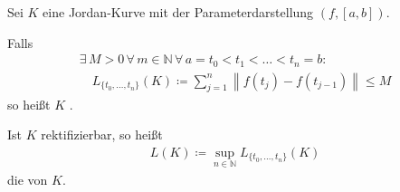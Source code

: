\documentclass[a4paper,10pt]{scrbook}
\begin{document}
\begin{theorem}[Definition]
  Sei $K$ eine Jordan-Kurve mit der Parameterdarstellung $(f,[a,b])$.
  \begin{enum-arab}
    \item Falls
    \begin{gather*}
      \exists \, M > 0 \, \forall \, m \in \mathbb{N} \, \forall \, a=t_0 < t_1 < \ldots < t_n=b : \\ \quad L_{\{t_0,\ldots,t_n\}}(K) \coloneq \sum\limits_{j=1}^{n} \left\| f(t_j) - f(t_{j-1}) \right\| \leq M
    \end{gather*}
    so heißt $K$ . 

    \begin{figure}[H]
      \centering
    \end{figure}

    \item Ist $K$ rektifizierbar, so heißt
    \begin{align*}
      L(K) \coloneq \sup\limits_{n \in \mathbb{N}} L_{\{t_0,\ldots,t_n\}}(K)
    \end{align*}
    die  von $K$.
  \end{enum-arab}
\end{theorem}
\end{document}
